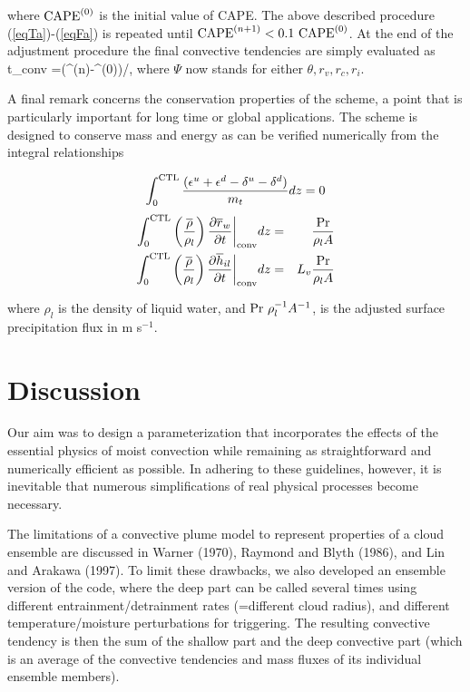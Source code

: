 \noindent
where ${\rm CAPE}^{(0)}$ is the initial value of CAPE.
The above described procedure
(\ref{eqTa})-(\ref{eqFa}) is repeated until
${\rm CAPE}^{(n+1)} < 0.1\,\, {\rm CAPE}^{(0)}$.
At the end of the adjustment procedure the final convective tendencies
are simply evaluated as
\beq
 {\partial\overline{\Psi}\over\partial t}\bigg\vert_{\rm conv}
 =(\overline{\Psi}^{(n)}-\overline{\Psi}^{(0)})/\tau,
\label{eqTH}
\eeq
where $\Psi$ now stands for either $\theta, r_v, r_c, r_i$.

A final remark concerns the conservation properties of the scheme, a
point that is particularly important for long time or global applications.
The scheme is designed to conserve mass and energy
as can be verified numerically from the  integral relationships

\begin{eqnarray}
\int_0^{\rm CTL}{(\epsilon^u+\epsilon^d-\delta^u-\delta^d)
\over m_t} dz = 0
\end{eqnarray}
\begin{eqnarray}
\int_{0}^{\rm CTL}  \left( {\overline{\rho}\over\rho_l}\right)
{\partial\overline{r}_w\over \partial t}\bigg\vert_{\rm conv} dz &=&
{{\rm Pr}\over \rho_l A }\\
\int_0^{\rm CTL} \left( {\overline{\rho}\over\rho_l}\right)
 {\partial\overline{h}_{il}\over\partial t}\bigg\vert_{\rm conv} dz &= &
L_v {{\rm Pr}\over \rho_l A }
\label{econs}
\end{eqnarray}

\noindent
where
 $\rho_l$ is the density of liquid water, and
${\rm Pr}\,\,\rho_l^{-1} A^{-1}$,
 is the adjusted surface precipitation flux in m s$^{-1}$.

\section{Discussion}
Our aim was to design a parameterization that incorporates the effects of the
essential physics of moist convection while remaining as straightforward and
numerically efficient as possible.  In adhering to these guidelines, however,
it is inevitable that numerous simplifications of real physical processes become
necessary.  

The limitations of a convective plume model to represent properties of a cloud ensemble
are discussed in Warner (1970), Raymond and Blyth (1986), and Lin and Arakawa (1997). 
To limit these drawbacks, we also developed an ensemble version of the code, where
the deep part can be called several times using different entrainment/detrainment rates
(=different cloud radius), and different temperature/moisture perturbations for triggering.
The resulting convective tendency is then the sum of the shallow part and the deep
convective part (which is an average of the convective tendencies and mass fluxes  of 
its individual ensemble members).




